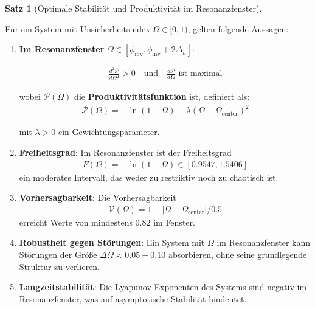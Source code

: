 \documentclass[a4paper,12pt,twoside]{report}
\theoremstyle{definition}
\newtheorem{satz}{Satz}
\begin{document}
\begin{satz}[Optimale Stabilität und Produktivität im Resonanzfenster]
\label{satz:resonance_window_stability}

Für ein System mit Unsicherheitsindex $\Omega \in [0, 1)$, gelten folgende Aussagen:

\begin{enumerate}
	\item \textbf{Im Resonanzfenster} $\Omega \in [\phi_{\text{inv}}, \phi_{\text{inv}} + 2\Delta_h]$:
	
	\begin{align}
	\frac{d^2 \mathcal{P}}{d\Omega^2} > 0 \quad \text{und} \quad \frac{d\mathcal{P}}{d\Omega} \text{ ist maximal}
	\end{align}
	
	wobei $\mathcal{P}(\Omega)$ die \textbf{Produktivitätsfunktion} ist, definiert als:
	\begin{align}
	\mathcal{P}(\Omega) = -\ln(1-\Omega) - \lambda(\Omega - \Omega_{\text{center}})^2
	\end{align}
	
	mit $\lambda > 0$ ein Gewichtungsparameter.
	
	\item \textbf{Freiheitsgrad}: Im Resonanzfenster ist der Freiheitsgrad
	\begin{align}
	F(\Omega) = -\ln(1-\Omega) \in [0.9547, 1.5406]
	\end{align}
	ein moderates Intervall, das weder zu restriktiv noch zu chaotisch ist.
	
	\item \textbf{Vorhersagbarkeit}: Die Vorhersagbarkeit 
	\begin{align}
	\mathcal{V}(\Omega) = 1 - |\Omega - \Omega_{\text{center}}| / 0.5
	\end{align}
	erreicht Werte von mindestens $0.82$ im Fenster.
	
	\item \textbf{Robustheit gegen Störungen}: Ein System mit $\Omega$ im Resonanzfenster kann Störungen der Größe $\Delta \Omega \approx 0.05-0.10$ absorbieren, ohne seine grundlegende Struktur zu verlieren.
	
	\item \textbf{Langzeitstabilität}: Die Lyapunov-Exponenten des Systems sind negativ im Resonanzfenster, was auf asymptotische Stabilität hindeutet.
\end{enumerate}

\end{satz}
\end{document}
